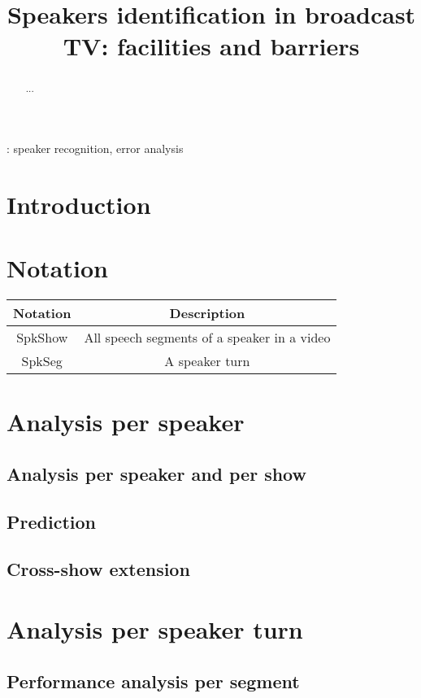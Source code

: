\documentclass[a4paper]{article}
\title{Speakers identification in broadcast TV: facilities and barriers}
\begin{document}
\maketitle
%
\begin{abstract}
...
\end{abstract}
: speaker recognition, error analysis


\section{Introduction}

\section{Notation}

\begin{tabular}{|c|c|}
\hline 
Notation & Description \\ 
\hline 
\hline
SpkShow & All speech segments of a speaker in a video \\ 
SpkSeg  & A speaker turn \\ 
\hline 
\end{tabular} 

 


\section{Analysis per speaker}

\subsection{Analysis per speaker and per show}

\subsection{Prediction}

\subsection{Cross-show extension}



\section{Analysis per speaker turn}

\subsection{Performance analysis per segment}
\end{document}
